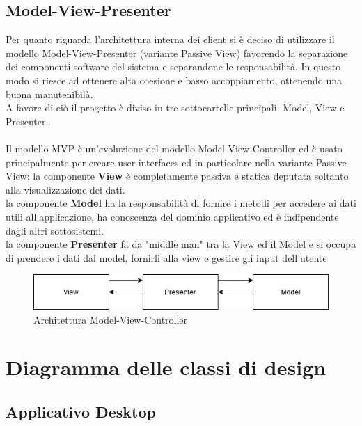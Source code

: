 \subsection{Model-View-Presenter}
Per quanto riguarda l'architettura interna dei client si è deciso di utilizzare il modello Model-View-Presenter (variante Passive View)
favorendo la separazione dei componenti software del sistema e separandone le responsabilità.
In questo modo si riesce ad ottenere alta coesione e basso accoppiamento, ottenendo una buona manutenibilà.\\
A favore di ciò il progetto è diviso in tre sottocartelle principali: Model, View e Presenter.\\
\\
Il modello MVP è un'evoluzione del modello Model View Controller ed è usato principalmente per creare user interfaces 
ed in particolare nella variante Passive View:
la componente \textbf{View} è completamente passiva e statica deputata soltanto alla visualizzazione dei dati.\\
la componente \textbf{Model} ha la responsabilità di fornire i metodi per accedere
ai dati utili all'applicazione, ha conoscenza del dominio applicativo ed è indipendente
dagli altri sottosistemi.\\
la componente \textbf{Presenter} fa da "middle man" tra la View ed il Model e si occupa di prendere i dati dal model, 
fornirli alla view e gestire gli input dell'utente
\begin{center}
    \begin{figure}[H]
        \includegraphics[width=\textwidth]{Figures/MVP client.png}
        \caption{Architettura Model-View-Controller}
    \end{figure}
\end{center}
\section{Diagramma delle classi di design}
\subsection{Applicativo Desktop}

\pagebreak

